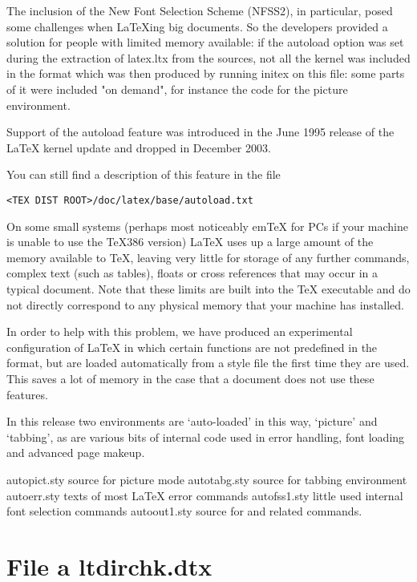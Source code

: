 The inclusion of the New Font Selection Scheme (NFSS2), in particular, posed some challenges when LaTeXing big documents. So the developers provided a solution for people with limited memory available: if the autoload option was set during the extraction of latex.ltx from the sources, not all the kernel was included in the format which was then produced by running initex on this file: some parts of it were included "on demand", for instance the code for the picture environment.

Support of the autoload feature was introduced in the June 1995 release of the LaTeX kernel update and dropped in December 2003.

You can still find a description of this feature in the file

\begin{verbatim}
<TEX DIST ROOT>/doc/latex/base/autoload.txt
\end{verbatim}

On some small systems (perhaps most noticeably emTeX for PCs if your machine is unable to use the TeX386 version) LaTeX uses up a large amount of the memory available to TeX, leaving very little for storage of any further commands, complex text (such as tables), floats or cross references that may occur in a typical document. Note that these limits are built into the TeX executable and do not directly correspond to any physical memory that your machine has installed.

In order to help with this problem, we have produced an experimental configuration of LaTeX in which certain functions are not predefined in the format, but are loaded automatically from a style file the first time they are used. This saves a lot of memory in the case that a document does not use these features.

In this release two environments are ‘auto-loaded’ in this way, ‘picture’ and ‘tabbing’, as are various bits of internal code used in error handling, font loading and advanced page makeup.

  autopict.sty      source for picture mode
  autotabg.sty      source for tabbing environment
  autoerr.sty       texts of most LaTeX error commands
  autofss1.sty      little used internal font selection commands
  autoout1.sty      source for  and related commands.

\makeatletter

\section{File a ltdirchk.dtx}

